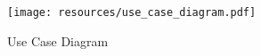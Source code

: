\begin{figure}[H]
    \centering
        \texttt{[image: resources/use\_case\_diagram.pdf]}    
    \caption{Use Case Diagram}
    \label{}
\end{figure}

